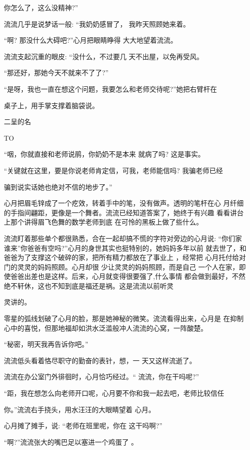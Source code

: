 \documentclass{article}
\begin{document}
你怎么了，这么没精神?” 

流流几乎是说梦话一般: “我奶奶感冒了，
我昨天照顾她来着。 

“啊? 那没什么大碍吧?”心月把眼睛睁得
大大地望着流流。 

流流支起沉重的眼皮: “没什么，不过要几
天不出屋，以免再受风。 


“那还好，那她今天不就来不了了?” 

“是呀，我也一直在想这个问题，我要怎么和老师交待呢?”她把右臂杆在

桌子上，用手掌支撑着脑袋说。 


二呈的名

TO 

\newpage

“咽，你就直接和老师说鹃，你奶奶不是本来
就病了吗? 这是事实。 

“关键就在这里，要是你说老师肯定信，可我，老师能信吗? 我骗老师已经

骗到说实话她也绝对不信的地步了。” 

心月把眉毛锌成了一个疙效，转着手中的笔，没有做声。透明的笔杆在心
月纤细的手指间翩距，更像是一个舞者。流流已经知道答案了，她终于有兴趣
看看讲台上那个讲得眉飞色舞的数学老师到底
在可怜的黑板上做了些什么。 

流流盯着那些单个都很熟悉，合在一起却搞不慌的字符对旁边的心月说:
“你们家谁来”你爸爸有空吗?”心月的身世其实也挺特别的，她妈妈多年以前
就去世了，和爸爸为了支撑这个破碎的家，把所有精力都放在了事业上 ，经常把
心月托付给对门的灵灵的妈妈照顾。心月却很
\newpage
少让灵灵的妈妈照顾，而是自己
一个人在家，即使爸爸出差也是这样。后来，心月就变得很要强了,什么事情
都会做到最好，不然绝不轩休，这也不知到底是福还是祸。这是流流以前听灵

灵讲的。 

零星的弧线划破了心月的脸，那是她神秘的微笑。流流看得出来，心月是
在抑制心中的喜悦，但那地福却如洪水泛滥般冲人流流的心窝，一阵酸楚。

“秘密，明天我再告诉你吧。” 

流流低头看着恪尽职守的勤奋的表针，想，一
天又这样流逝了。 

流流在办公室门外徘徊时，心月恰巧经过。“
流流，你在干吗呢?” 

“距，我在想怎么向老师开口呢，心月要不你和我一起去吧，老师比较信任
\newpage

你。”流流右手挠头，用水汪汪的大眼睛望着
心月。 

心月摊了摊手，说: “老师在班里呢，你在
这干吗啊?” 

“啊?”流流张大的嘴巴足以塞进一个鸡蛋了
。 
\end{document}
